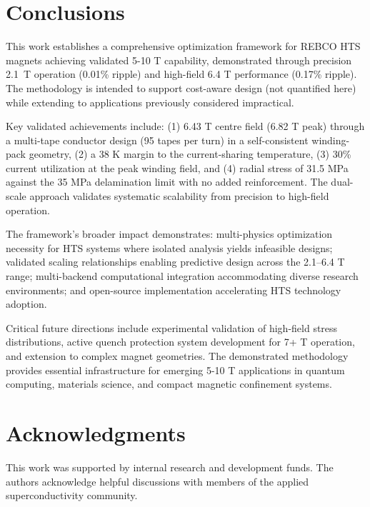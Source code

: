 \documentclass[aps,prb,preprint,amsmath,amssymb]{revtex4-2}
\begin{document}
\section{Conclusions}

This work establishes a comprehensive optimization framework for REBCO HTS magnets achieving validated 5-10 T capability, demonstrated through precision 2.1~T operation (0.01\% ripple) and high-field 6.4 T performance (0.17\% ripple). The methodology is intended to support cost-aware design (not quantified here) while extending to applications previously considered impractical.

Key validated achievements include: (1) 6.43 T centre field (6.82 T peak) through a multi-tape conductor design (95 tapes per turn) in a self-consistent winding-pack geometry, (2) a 38 K margin to the current-sharing temperature, (3) 30\% current utilization at the peak winding field, and (4) radial stress of 31.5 MPa against the 35 MPa delamination limit with no added reinforcement. The dual-scale approach validates systematic scalability from precision to high-field operation.

The framework's broader impact demonstrates: multi-physics optimization necessity for HTS systems where isolated analysis yields infeasible designs; validated scaling relationships enabling predictive design across the 2.1--6.4 T range; multi-backend computational integration accommodating diverse research environments; and open-source implementation accelerating HTS technology adoption.

Critical future directions include experimental validation of high-field stress distributions, active quench protection system development for 7+ T operation, and extension to complex magnet geometries. The demonstrated methodology provides essential infrastructure for emerging 5-10 T applications in quantum computing, materials science, and compact magnetic confinement systems.

\section{Acknowledgments}

This work was supported by internal research and development funds. The authors acknowledge helpful discussions with members of the applied superconductivity community.



\end{document}
